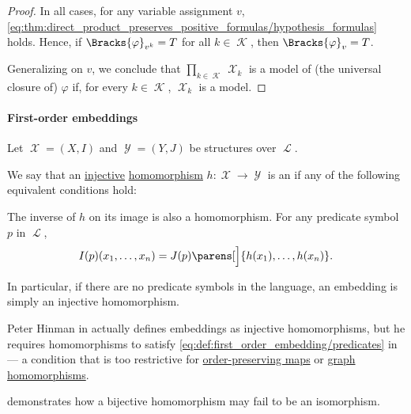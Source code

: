 \begin{proof}
  In all cases, for any variable assignment \( v \), \eqref{eq:thm:direct_product_preserves_positive_formulas/hypothesis_formulas} holds. Hence, if \( \Bracks{\varphi}_{v^k} = T \) for all \( k \in \mscrK \), then \( \Bracks{\varphi}_v = T \).

  Generalizing on \( v \), we conclude that \( \prod_{k \in \mscrK} \mscrX_k \) is a model of (the universal closure of) \( \varphi \) if, for every \( k \in \mscrK \), \( \mscrX_k \) is a model.
\end{proof}

\paragraph{First-order embeddings}

\begin{definition}\label{def:first_order_embedding}
  Let \( \mscrX = (X, I) \) and \( \mscrY = (Y, J) \) be structures over \( \mscrL \).

  We say that an \hyperref[def:function_invertibility/injective]{injective} \hyperref[def:first_order_homomorphism]{homomorphism} \( h: \mscrX \to \mscrY \) is an  if any of the following equivalent conditions hold:

  \begin{thmenum}
     The inverse of \( h \) on its image is also a homomorphism.
     For any predicate symbol \( p \) in \( \mscrL \),
    \begin{equation}\label{eq:def:first_order_embedding/predicates}
      I(p) (x_1, \ldots, x_n) = J(p) \parens[\Big]{ h(x_1), \ldots, h(x_n) }.
    \end{equation}
  \end{thmenum}
\end{definition}
\begin{comments}
  \item In particular, if there are no predicate symbols in the language, an embedding is simply an injective homomorphism.

  \item Peter Hinman in  actually defines embeddings as injective homomorphisms, but he requires homomorphisms to satisfy \eqref{eq:def:first_order_embedding/predicates} in \cite[def. 2.3.26(i)]{Hinman2005} --- a condition that is too restrictive for \hyperref[def:order_function]{order-preserving maps} or \hyperref[def:directed_graph/homomorphism]{graph homomorphisms}.

  \item {} demonstrates how a bijective homomorphism may fail to be an isomorphism.
\end{comments}
